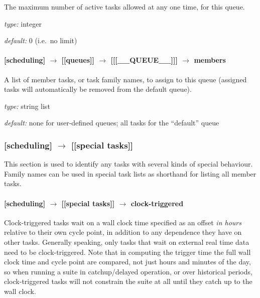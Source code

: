 The maximum number of active tasks allowed at any one time, for this queue.
\begin{myitemize}
\item {\em type:} integer
\item {\em default:} 0 (i.e.\ no limit)
\end{myitemize}

\paragraph[members]{[scheduling] $\rightarrow$ [[queues]] $\rightarrow$ [[[\_\_QUEUE\_\_]]] $\rightarrow$ members}

A list of member tasks, or task family names, to assign to this queue
(assigned tasks will automatically be removed from the default queue).
\begin{myitemize}
\item {\em type:} string list
\item {\em default:} none for user-defined queues; all tasks for the ``default'' queue
\end{myitemize}

\subsubsection[{[[}special tasks{]]}]{[scheduling] $\rightarrow$ [[special tasks]]}

This section is used to identify any tasks with several kinds of special
behaviour. Family names can be used in special task lists as shorthand
for listing all member tasks.

\paragraph[clock-triggered]{[scheduling] $\rightarrow$ [[special tasks]] $\rightarrow$ clock-triggered}

Clock-triggered tasks wait on a wall clock time specified as an offset
{\em in hours} relative to their own cycle point, in addition to any
dependence they have on other tasks. Generally speaking, only tasks that
wait on external real time data need to be clock-triggered.  Note that
in computing the trigger time the full wall clock time and cycle point
are compared, not just hours and minutes of the day, so when running a
suite in catchup/delayed operation, or over historical periods,
clock-triggered tasks will not constrain the suite at all until they
catch up to the wall clock.

